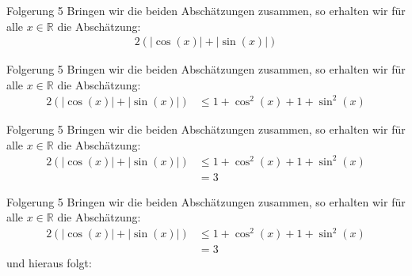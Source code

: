 \documentclass[10pt]{beamer}
\def\bR{\mathbb{R}}
\begin{document}
\begin{frame}{Folgerung 5}
    Bringen wir die beiden Abschätzungen zusammen, so erhalten wir für alle \( x \in \bR \) die Abschätzung:
    \begin{align*}
        2 \left( \left\vert \cos\left( x \right) \right\vert + \left\vert \sin\left( x \right) \right\vert \right)
    \end{align*}
\end{frame}



\begin{frame}{Folgerung 5}
    Bringen wir die beiden Abschätzungen zusammen, so erhalten wir für alle \( x \in \bR \) die Abschätzung:
    \begin{align*}
        2 \left( \left\vert \cos\left( x \right) \right\vert + \left\vert \sin\left( x \right) \right\vert \right)
        & \leq 1 + \cos^{2}\left( x \right) + 1 + \sin^{2}\left( x \right)
    \end{align*}
\end{frame}



\begin{frame}{Folgerung 5}
    Bringen wir die beiden Abschätzungen zusammen, so erhalten wir für alle \( x \in \bR \) die Abschätzung:
    \begin{align*}
        2 \left( \left\vert \cos\left( x \right) \right\vert + \left\vert \sin\left( x \right) \right\vert \right)
        & \leq 1 + \cos^{2}\left( x \right) + 1 + \sin^{2}\left( x \right) \\
        & = 3
    \end{align*}
\end{frame}



\begin{frame}{Folgerung 5}
    Bringen wir die beiden Abschätzungen zusammen, so erhalten wir für alle \( x \in \bR \) die Abschätzung:
    \begin{align*}
        2 \left( \left\vert \cos\left( x \right) \right\vert + \left\vert \sin\left( x \right) \right\vert \right)
        & \leq 1 + \cos^{2}\left( x \right) + 1 + \sin^{2}\left( x \right) \\
        & = 3
    \end{align*}
    und hieraus folgt:
\end{frame}
\end{document}

